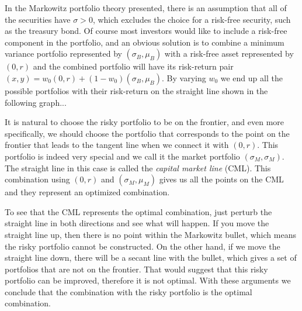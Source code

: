 In the Markowitz portfolio theory presented, there is an assumption that all of the securities have $\sigma > 0$, which excludes the choice for a risk-free security, such
as the treasury bond. Of course most investors would like to include a risk-free component in the portfolio, and an obvious solution is to combine a minimum
variance portfolio represented by $(\sigma_B, \mu_B)$ with a risk-free asset represented by $(0, r)$ and the combined portfolio will have its risk-return pair
$(x, y) = w_0(0, r) + (1-w_0)(\sigma_B, \mu_B)$.
By varying $w_0$ we end up all the possible portfolios with their risk-return on the straight line shown in the following graph...

It is natural to choose the risky portfolio to be on the frontier, and even more specifically, we should choose the portfolio that corresponds to the point on the
frontier that leads to the tangent line when we connect it with $(0, r)$. This portfolio is indeed very special and we call it the market portfolio $(\sigma_M, \sigma_M)$.
The straight line in this case is called the \emph{capital market line} (CML). This combination using $(0, r)$ and $(\sigma_M, \mu_M)$ gives us all the points on the CML and they represent an optimized combination.

To see that the CML represents the optimal combination, just perturb the straight line in both directions and see what will happen. If you move the straight line up, then there is no point within the Markowitz bullet, which means the risky portfolio cannot be constructed. On the other hand, if we move the straight line down, there will be a secant line with the bullet, which gives a set of portfolios that are not on the frontier. That would suggest that this risky portfolio can be improved, therefore it is not optimal. With these arguments we conclude that the combination with the risky portfolio is the optimal combination.

